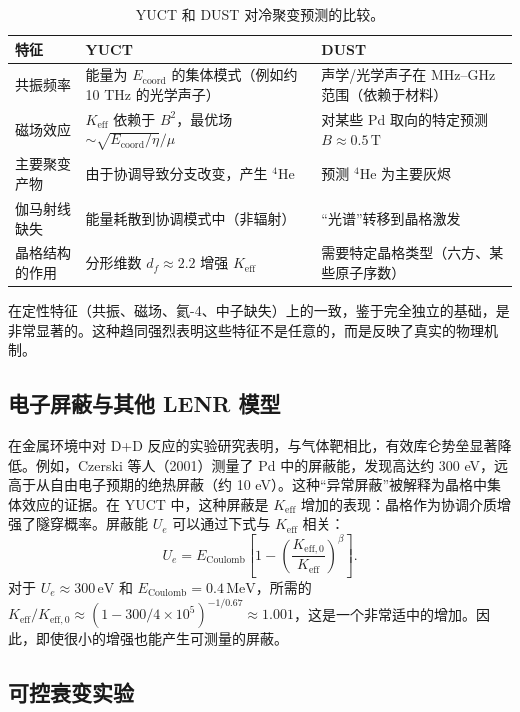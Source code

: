 \documentclass[12pt]{article}
\theoremstyle{remark}
\newcommand{\Keff}{K_{\mathrm{eff}}}
\newcommand{\Keffzero}{K_{\mathrm{eff},0}}
\newcommand{\df}{d_{\!f}}
\begin{document}
	\begin{table}[htbp]
		\centering
		\caption{YUCT 和 DUST 对冷聚变预测的比较。}
		\label{tab:comparison}
		\small
		\begin{tabularx}{\textwidth}{l X X}
			\toprule
			\textbf{特征} & \textbf{YUCT} & \textbf{DUST} \\
			\midrule
			共振频率 & 能量为 \(E_{\mathrm{coord}}\) 的集体模式（例如约 10 THz 的光学声子） & 声学/光学声子在 MHz–GHz 范围（依赖于材料） \\
			磁场效应 & \(\Keff\) 依赖于 \(B^2\)，最优场 \(\sim \sqrt{E_{\mathrm{coord}}/\eta}/\mu\) & 对某些 Pd 取向的特定预测 \(B \approx 0.5\,\text{T}\) \\
			主要聚变产物 & 由于协调导致分支改变，产生 \(^4\)He & 预测 \(^4\)He 为主要灰烬 \\
			伽马射线缺失 & 能量耗散到协调模式中（非辐射） & “光谱”转移到晶格激发 \\
			晶格结构的作用 & 分形维数 \(\df \approx 2.2\) 增强 \(\Keff\) & 需要特定晶格类型（六方、某些原子序数） \\
			\bottomrule
		\end{tabularx}
	\end{table}
	
	在定性特征（共振、磁场、氦-4、中子缺失）上的一致，鉴于完全独立的基础，是非常显著的。这种趋同强烈表明这些特征不是任意的，而是反映了真实的物理机制。
	
	\subsection{电子屏蔽与其他 LENR 模型}
	
	在金属环境中对 D+D 反应的实验研究表明，与气体靶相比，有效库仑势垒显著降低。例如，Czerski 等人（2001）测量了 Pd 中的屏蔽能，发现高达约 300 eV，远高于从自由电子预期的绝热屏蔽（约 10 eV）。这种“异常屏蔽”被解释为晶格中集体效应的证据。在 YUCT 中，这种屏蔽是 \(\Keff\) 增加的表现：晶格作为协调介质增强了隧穿概率。屏蔽能 \(U_e\) 可以通过下式与 \(\Keff\) 相关：
	\begin{equation}
		U_e = E_{\text{Coulomb}} \left[1 - \left(\frac{\Keffzero}{\Keff}\right)^{\beta}\right].
	\end{equation}
	对于 \(U_e \approx 300\,\text{eV}\) 和 \(E_{\text{Coulomb}} = 0.4\,\text{MeV}\)，所需的 \(\Keff/\Keffzero \approx (1 - 300/4\times10^5)^{-1/0.67} \approx 1.001\)，这是一个非常适中的增加。因此，即使很小的增强也能产生可测量的屏蔽。
	
	\subsection{可控衰变实验}
	
\end{document}
